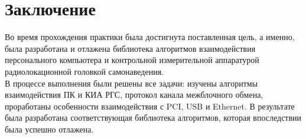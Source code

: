 \section*{Заключение}
Во время прохождения практики была достигнута поставленная цель, а именно, была разработана и отлажена библиотека алгоритмов взаимодействия персонального компьютера и контрольной измерительной аппаратурой радиолокационной головкой самонаведения. \\

В процессе выполнения были решены все задачи: изучены алгоритмы взаимодействия ПК и КИА РГС, протокол канала межблочного обмена, проработаны особенности взаимодействия с PCI, USB и Ethernet. В результате была разработана соответствующая библиотека алгоритмов, которая впоследствии была успешно отлажена.
